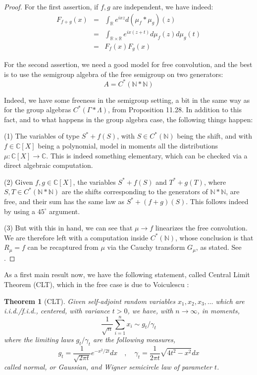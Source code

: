 \documentclass[12pt]{amsbook}
\newtheorem{theorem}{Theorem}[chapter]
\begin{document}
\begin{proof}
For the first assertion, if $f,g$ are independent, we have indeed:
\begin{eqnarray*}
F_{f+g}(x)
&=&\int_\mathbb Re^{ixz}d(\mu_f*\mu_g)(z)\\
&=&\int_{\mathbb R\times\mathbb R}e^{ix(z+t)}d\mu_f(z)d\mu_g(t)\\
&=&F_f(x)F_g(x)
\end{eqnarray*}

For the second assertion, we need a good model for free convolution, and the best is to use the semigroup algebra of the free semigroup on two generators:
$$A=C^*(\mathbb N*\mathbb N)$$

Indeed, we have some freeness in the semigroup setting, a bit in the same way as for the group algebras $C^*(\Gamma*\Lambda)$, from Proposition 11.28. In addition to this fact, and to what happens in the group algebra case, the following things happen:

\medskip

(1) The variables of type $S^*+f(S)$, with $S\in C^*(\mathbb N)$ being the shift, and with $f\in\mathbb C[X]$ being a polynomial, model in moments all the distributions $\mu:\mathbb C[X]\to\mathbb C$. This is indeed something elementary, which can be checked via a direct algebraic computation.

\medskip

(2) Given $f,g\in\mathbb C[X]$, the variables $S^*+f(S)$ and $T^*+g(T)$, where $S,T\in C^*(\mathbb N*\mathbb N)$ are the shifts corresponding to the generators of $\mathbb N*\mathbb N$, are free, and their sum has the same law as $S^*+(f+g)(S)$. This follows indeed by using a $45^\circ$ argument.

\medskip

(3) But with this in hand, we can see that $\mu\to f$ linearizes the free convolution. We are therefore left with a computation inside $C^*(\mathbb N)$, whose conclusion is that $R_\mu=f$ can be recaptured from $\mu$ via the Cauchy transform $G_\mu$, as stated. See \cite{vdn}.
\end{proof}

As a first main result now, we have the following statement, called Central Limit Theorem (CLT), which in the free case is due to Voiculescu \cite{vdn}:

\begin{theorem}[CLT]
Given self-adjoint random variables $x_1,x_2,x_3,\ldots$ which are i.i.d./f.i.d., centered, with variance $t>0$, we have, with $n\to\infty$, in moments,
$$\frac{1}{\sqrt{n}}\sum_{i=1}^nx_i\sim g_t/\gamma_t$$
where the limiting laws $g_t/\gamma_t$ are the following measures,
$$g_t=\frac{1}{\sqrt{2\pi t}}e^{-x^2/2t}dx\quad,\quad 
\gamma_t=\frac{1}{2\pi t}\sqrt{4t^2-x^2}dx$$
called normal, or Gaussian, and Wigner semicircle law of parameter $t$.
\end{theorem}
\end{document}
